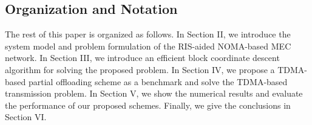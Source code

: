 \documentclass[journal]{IEEEtran}
\begin{document}

\subsection{Organization and Notation}
The rest of this paper is organized as follows. In Section II, we introduce the system model and problem formulation of the RIS-aided NOMA-based MEC network. In Section III, we introduce an efficient block coordinate descent algorithm for solving the proposed problem. In Section IV, we propose a TDMA-based partial offloading scheme as a benchmark and solve the TDMA-based transmission problem. In Section V, we show the numerical results and evaluate the performance of our proposed schemes. Finally, we give the conclusions in Section VI.
\end{document}
